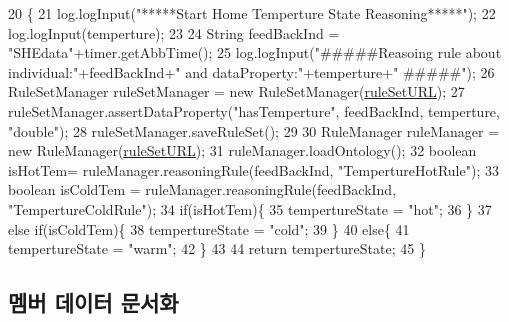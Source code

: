 \begin{DoxyCode}
20                                                                       \{
21         log.logInput(\textcolor{stringliteral}{"*****Start Home Temperture State Reasoning*****"});
22         log.logInput(temperture);
23         
24         String feedBackInd = \textcolor{stringliteral}{"SHEdata"}+timer.getAbbTime();
25         log.logInput(\textcolor{stringliteral}{"#####Reasoing rule about individual:"}+feedBackInd+\textcolor{stringliteral}{" and dataProperty:"}+temperture+\textcolor{stringliteral}{"
      #####"});
26         RuleSetManager ruleSetManager = \textcolor{keyword}{new} RuleSetManager(\mbox{\hyperlink{classcom_1_1github_1_1aites_1_1shlocalaites_1_1analyze_1_1_temperature_state_reasoner_af2c499ddf5d8d5cc0394b6ba37c948f7}{ruleSetURL}});
27         ruleSetManager.assertDataProperty(\textcolor{stringliteral}{"hasTemperture"}, feedBackInd, temperture, \textcolor{stringliteral}{"double"});
28         ruleSetManager.saveRuleSet();
29         
30         RuleManager ruleManager = \textcolor{keyword}{new} RuleManager(\mbox{\hyperlink{classcom_1_1github_1_1aites_1_1shlocalaites_1_1analyze_1_1_temperature_state_reasoner_af2c499ddf5d8d5cc0394b6ba37c948f7}{ruleSetURL}});
31         ruleManager.loadOntology(); 
32         \textcolor{keywordtype}{boolean} isHotTem= ruleManager.reasoningRule(feedBackInd, \textcolor{stringliteral}{"TempertureHotRule"});
33         \textcolor{keywordtype}{boolean} isColdTem = ruleManager.reasoningRule(feedBackInd, \textcolor{stringliteral}{"TempertureColdRule"});
34         \textcolor{keywordflow}{if}(isHotTem)\{
35             tempertureState = \textcolor{stringliteral}{"hot"};
36         \}
37         \textcolor{keywordflow}{else} \textcolor{keywordflow}{if}(isColdTem)\{
38             tempertureState = \textcolor{stringliteral}{"cold"};
39         \}
40         \textcolor{keywordflow}{else}\{
41             tempertureState = \textcolor{stringliteral}{"warm"};
42         \}
43         
44         \textcolor{keywordflow}{return} tempertureState;
45     \}
\end{DoxyCode}


\subsection{멤버 데이터 문서화}
\mbox{\label{classcom_1_1github_1_1aites_1_1shlocalaites_1_1analyze_1_1_temperature_state_reasoner_af2c499ddf5d8d5cc0394b6ba37c948f7}} 
